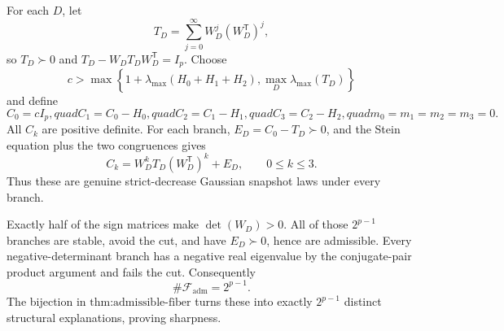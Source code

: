 For each \(D\), let
\[
 T_D=\sum_{j=0}^{\infty}W_D^j(W_D^{\mathsf T})^j,
\]
so \(T_D\succ0\) and \(T_D-W_DT_DW_D^{\mathsf T}=I_p\).  Choose
\[
 c>\max\left\{1+\lambda_{\max}(H_0+H_1+H_2),
 \max_D\lambda_{\max}(T_D)\right\}
\]
and define
\[
 C_0=cI_p,quad C_1=C_0-H_0,quad C_2=C_1-H_1,quad
 C_3=C_2-H_2,quad m_0=m_1=m_2=m_3=0.
\]
All \(C_k\) are positive definite.  For each branch, \(E_D=C_0-T_D\succ0\), and the Stein equation plus the two congruences gives
\[
 C_k=W_D^kT_D(W_D^{\mathsf T})^k+E_D,\qquad 0\leq k\leq3.
\]
Thus these are genuine strict-decrease Gaussian snapshot laws under every branch.

Exactly half of the sign matrices make \(\det(W_D)>0\).  All of those \(2^{p-1}\) branches are stable, avoid the cut, and have \(E_D\succ0\), hence are admissible.  Every negative-determinant branch has a negative real eigenvalue by the conjugate-pair product argument and fails the cut.  Consequently
\[
 \#\mathcal F_{\mathrm{adm}}=2^{p-1}.
\]
The bijection in \(\text{thm:admissible-fiber}\) turns these into exactly \(2^{p-1}\) distinct structural explanations, proving sharpness.

